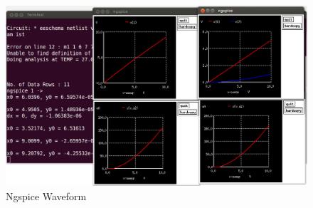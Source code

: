 \begin{figure}
\begin{center}
\includegraphics[width=1\linewidth]{figures/mosfet4.png}
\caption{Ngspice Waveform}
\label{mos4}
\end{center}
\end{figure}


